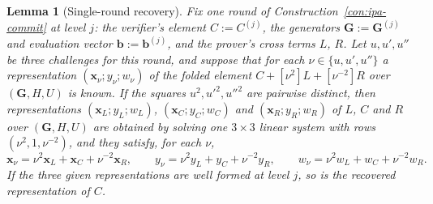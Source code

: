\documentclass[11pt,a4paper]{article}
\newtheorem{lemma}[theorem]{Lemma}
\theoremstyle{definition}
\begin{document}
\begin{lemma}[Single-round recovery]\label{lem:ipa-single-round}
Fix one round of Construction~\ref{con:ipa-commit} at level $j$: the
verifier's element $C := C^{(j)}$, the generators $\mathbf G :=
\mathbf G^{(j)}$ and evaluation vector $\mathbf b := \mathbf b^{(j)}$,
and the prover's cross terms $L$, $R$. Let $u, u', u''$ be three
challenges for this round, and suppose that for each
$\nu \in \{u, u', u''\}$ a representation $(\mathbf x_\nu; y_\nu; w_\nu)$
of the folded element $C + [\nu^{2}]L + [\nu^{-2}]R$ over
$(\mathbf G, H, U)$ is known. If the squares $u^{2}, u'^{2}, u''^{2}$ are
pairwise distinct, then representations $(\mathbf x_L; y_L; w_L)$,
$(\mathbf x_C; y_C; w_C)$ and $(\mathbf x_R; y_R; w_R)$ of $L$, $C$
and $R$ over $(\mathbf G, H, U)$ are obtained by solving one
$3 \times 3$ linear system with rows $(\nu^{2}, 1, \nu^{-2})$, and
they satisfy, for each $\nu$,
\begin{equation}\label{eq:ipa-rep-identity}
\mathbf x_\nu = \nu^{2}\mathbf x_L + \mathbf x_C + \nu^{-2}\mathbf x_R,
\qquad
y_\nu = \nu^{2} y_L + y_C + \nu^{-2} y_R,
\qquad
w_\nu = \nu^{2} w_L + w_C + \nu^{-2} w_R .
\end{equation}
If the three given representations are well formed at level $j$, so
is the recovered representation of $C$.
\end{lemma}
\end{document}
